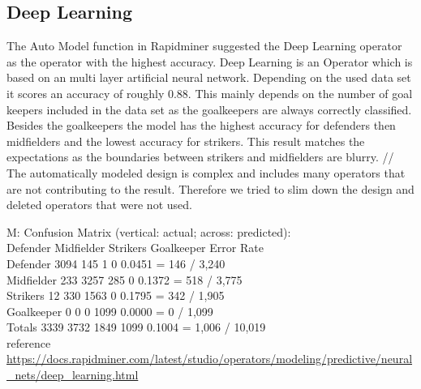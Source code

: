 \subsection{Deep Learning}

The Auto Model function in Rapidminer suggested the Deep Learning operator as the operator with the highest accuracy. Deep Learning is an Operator which is based on an multi layer artificial neural network. Depending on the used data set it scores an accuracy of roughly 0.88. This mainly depends on the number of goal keepers included in the data set as the goalkeepers are always correctly classified. Besides the goalkeepers the model has the highest accuracy for defenders then midfielders and the lowest accuracy for strikers. This result matches the expectations as the boundaries between strikers and midfielders are blurry. //
The automatically modeled design is complex and includes many operators that are not contributing to the result. Therefore we tried to slim down the design and deleted operators that were not used. 


M: Confusion Matrix (vertical: actual; across: predicted):\\
            Defender  Midfielder  Strikers  Goalkeeper   Error              Rate\\
  Defender      3094         145         1           0  0.0451  =    146 / 3,240\\
Midfielder       233        3257       285           0  0.1372  =    518 / 3,775\\
  Strikers        12         330      1563           0  0.1795  =    342 / 1,905\\
Goalkeeper         0           0         0        1099  0.0000  =      0 / 1,099\\
    Totals      3339        3732      1849        1099  0.1004  = 1,006 / 10,019\\
    
    reference\\
\url{https://docs.rapidminer.com/latest/studio/operators/modeling/predictive/neural_nets/deep_learning.html}
